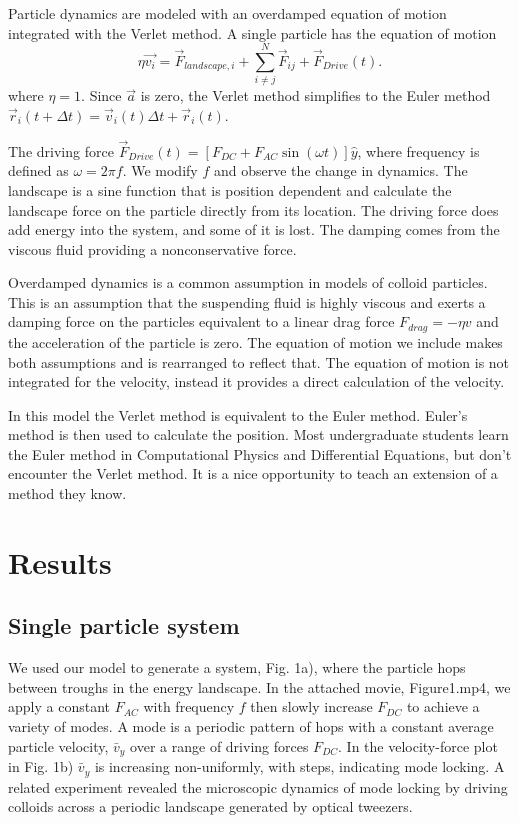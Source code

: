 \documentclass[prb,preprint]{revtex4}
\begin{document}
Particle dynamics are
modeled with an overdamped
equation of motion
integrated with the Verlet method.
A single particle has the equation of motion 
\begin{equation}
\eta \vec{v_i} = \vec{F}_{landscape,i} + \sum_{i \neq j}^{N} \vec{F}_{ij} + \vec{F}_{Drive}(t).
\end{equation}
where $\eta = 1$.
Since $\vec{a}$ is zero,
the Verlet method simplifies to 
the Euler method
$\vec{r}_i(t+\Delta t) = \vec{v}_i(t) \Delta t + \vec{r}_i(t)$.

 

The driving force $\vec{F}_{Drive}(t) = [F_{DC} + F_{AC} \sin(\omega t)] \hat{y}$, where frequency is defined as $\omega = 2 \pi f$.
We modify $f$ and observe the change in dynamics.
The landscape is a sine function that is position dependent and calculate the landscape force on the particle directly from its location. The driving force does add energy into the system, and some of it is lost. The damping comes from the viscous fluid providing a nonconservative force.

Overdamped dynamics is a common assumption in models of colloid particles. This is an assumption that the suspending fluid is highly viscous and exerts a damping force on the particles equivalent to a linear drag force $F_{drag} = - \eta v$ and the acceleration of the particle is zero. The equation of motion we include makes both assumptions and is rearranged to reflect that. The equation of motion is not integrated for the velocity, instead it provides a direct calculation of the velocity.  

In this model the Verlet method is equivalent to the Euler method.  Euler's method is then used to calculate the position. Most undergraduate students learn the Euler method in Computational Physics and Differential Equations, but don't encounter the Verlet method. It is a nice opportunity to teach an extension of a method they know. 

\section{Results}
\label{sec:results}

\subsection{Single particle system}
\label{sec:one}

We used our model to generate a system, Fig. 1a), where the particle hops between troughs in the energy landscape. In the attached movie, Figure1.mp4, we apply a constant $F_{AC}$ with frequency $f$ then slowly increase $F_{DC}$  to achieve a variety of modes. A mode is a periodic pattern of hops with a constant average particle velocity, $\bar{v}_{y}$ over a range of driving forces $F_{DC}$. In the velocity-force plot in Fig. 1b) $\bar{v}_{y}$ is increasing non-uniformly, with steps, indicating mode locking. A related experiment \cite{juniper2015} revealed the microscopic dynamics of mode locking by driving colloids across a periodic landscape generated by optical tweezers.
\end{document}
